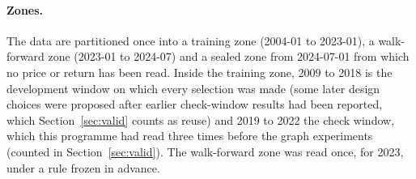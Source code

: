 \paragraph{Zones.}
The data are partitioned once into a training zone (2004-01 to 2023-01), a walk-forward zone (2023-01 to 2024-07) and a sealed zone from 2024-07-01 from which no price or return has been read. Inside the training zone, 2009 to 2018 is the development window on which every selection was made (some later design choices were proposed after earlier check-window results had been reported, which Section~\ref{sec:valid} counts as reuse) and 2019 to 2022 the check window, which this programme had read three times before the graph experiments (counted in Section~\ref{sec:valid}). The walk-forward zone was read once, for 2023, under a rule frozen in advance.

